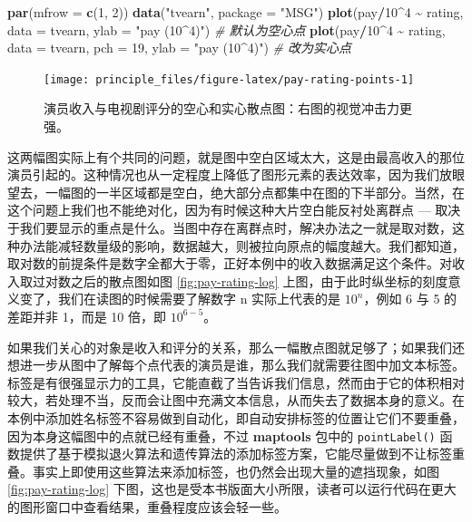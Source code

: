 \documentclass[
  b5paper,
  UTF8,twoside]{book}
\newenvironment{Shaded}{\begin{snugshade}}{\end{snugshade}}
\newcommand{\AttributeTok}[1]{\textcolor[rgb]{0.13,0.29,0.53}{#1}}
\newcommand{\CommentTok}[1]{\textcolor[rgb]{0.56,0.35,0.01}{\textit{#1}}}
\newcommand{\DecValTok}[1]{\textcolor[rgb]{0.00,0.00,0.81}{#1}}
\newcommand{\FunctionTok}[1]{\textcolor[rgb]{0.13,0.29,0.53}{\textbf{#1}}}
\newcommand{\NormalTok}[1]{#1}
\newcommand{\SpecialCharTok}[1]{\textcolor[rgb]{0.81,0.36,0.00}{\textbf{#1}}}
\newcommand{\StringTok}[1]{\textcolor[rgb]{0.31,0.60,0.02}{#1}}
\begin{document}
\begin{Shaded}
\begin{Highlighting}[]
\FunctionTok{par}\NormalTok{(}\AttributeTok{mfrow =} \FunctionTok{c}\NormalTok{(}\DecValTok{1}\NormalTok{, }\DecValTok{2}\NormalTok{))}
\FunctionTok{data}\NormalTok{(}\StringTok{"tvearn"}\NormalTok{, }\AttributeTok{package =} \StringTok{"MSG"}\NormalTok{)}
\FunctionTok{plot}\NormalTok{(pay}\SpecialCharTok{/}\DecValTok{10}\SpecialCharTok{\^{}}\DecValTok{4} \SpecialCharTok{\textasciitilde{}}\NormalTok{ rating, }\AttributeTok{data =}\NormalTok{ tvearn, }\AttributeTok{ylab =} \StringTok{"pay (10\^{}4)"}\NormalTok{) }\CommentTok{\# 默认为空心点}
\FunctionTok{plot}\NormalTok{(pay}\SpecialCharTok{/}\DecValTok{10}\SpecialCharTok{\^{}}\DecValTok{4} \SpecialCharTok{\textasciitilde{}}\NormalTok{ rating, }\AttributeTok{data =}\NormalTok{ tvearn, }\AttributeTok{pch =} \DecValTok{19}\NormalTok{, }\AttributeTok{ylab =} \StringTok{"pay (10\^{}4)"}\NormalTok{) }\CommentTok{\# 改为实心点}
\end{Highlighting}
\end{Shaded}

\begin{figure}

{\centering \texttt{[image: principle\_files/figure-latex/pay-rating-points-1]} 

}

\caption[演员收入与电视剧评分的空心和实心散点图]{演员收入与电视剧评分的空心和实心散点图：右图的视觉冲击力更强。}\label{fig:pay-rating-points}
\end{figure}



这两幅图实际上有个共同的问题，就是图中空白区域太大，这是由最高收入的那位演员引起的。这种情况也从一定程度上降低了图形元素的表达效率，因为我们放眼望去，一幅图的一半区域都是空白，绝大部分点都集中在图的下半部分。当然，在这个问题上我们也不能绝对化，因为有时候这种大片空白能反衬处离群点 --- 取决于我们要显示的重点是什么。当图中存在离群点时，解决办法之一就是取对数，这种办法能减轻数量级的影响，数据越大，则被拉向原点的幅度越大。我们都知道，取对数的前提条件是数字全都大于零，正好本例中的收入数据满足这个条件。对收入取过对数之后的散点图如图 \ref{fig:pay-rating-log} 上图，由于此时纵坐标的刻度意义变了，我们在读图的时候需要了解数字 n 实际上代表的是 \(10^{n}\)，例如 6 与 5 的差距并非 1，而是 10 倍，即 \(10^{6-5}\)。

如果我们关心的对象是收入和评分的关系，那么一幅散点图就足够了；如果我们还想进一步从图中了解每个点代表的演员是谁，那么我们就需要往图中加文本标签。标签是有很强显示力的工具，它能直截了当告诉我们信息，然而由于它的体积相对较大，若处理不当，反而会让图中充满文本信息，从而失去了数据本身的意义。在本例中添加姓名标签不容易做到自动化，即自动安排标签的位置让它们不要重叠，因为本身这幅图中的点就已经有重叠，不过 \textbf{maptools} 包中的 \texttt{pointLabel()} 函数提供了基于模拟退火算法和遗传算法的添加标签方案，它能尽量做到不让标签重叠。事实上即使用这些算法来添加标签，也仍然会出现大量的遮挡现象，如图 \ref{fig:pay-rating-log} 下图，这也是受本书版面大小所限，读者可以运行代码在更大的图形窗口中查看结果，重叠程度应该会轻一些。
\end{document}
